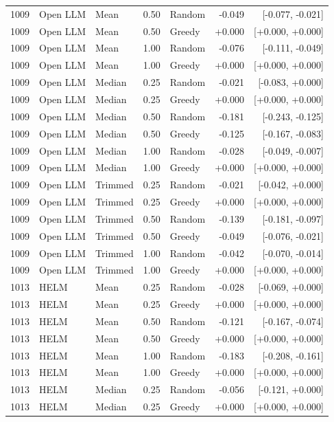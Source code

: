 \documentclass{article}
\begin{document}
\begin{longtable}{rlll lrr}
1009 & Open LLM & Mean & 0.50 & Random & -0.049 & [-0.077, -0.021] \\
1009 & Open LLM & Mean & 0.50 & Greedy & +0.000 & [+0.000, +0.000] \\
1009 & Open LLM & Mean & 1.00 & Random & -0.076 & [-0.111, -0.049] \\
1009 & Open LLM & Mean & 1.00 & Greedy & +0.000 & [+0.000, +0.000] \\
1009 & Open LLM & Median & 0.25 & Random & -0.021 & [-0.083, +0.000] \\
1009 & Open LLM & Median & 0.25 & Greedy & +0.000 & [+0.000, +0.000] \\
1009 & Open LLM & Median & 0.50 & Random & -0.181 & [-0.243, -0.125] \\
1009 & Open LLM & Median & 0.50 & Greedy & -0.125 & [-0.167, -0.083] \\
1009 & Open LLM & Median & 1.00 & Random & -0.028 & [-0.049, -0.007] \\
1009 & Open LLM & Median & 1.00 & Greedy & +0.000 & [+0.000, +0.000] \\
1009 & Open LLM & Trimmed & 0.25 & Random & -0.021 & [-0.042, +0.000] \\
1009 & Open LLM & Trimmed & 0.25 & Greedy & +0.000 & [+0.000, +0.000] \\
1009 & Open LLM & Trimmed & 0.50 & Random & -0.139 & [-0.181, -0.097] \\
1009 & Open LLM & Trimmed & 0.50 & Greedy & -0.049 & [-0.076, -0.021] \\
1009 & Open LLM & Trimmed & 1.00 & Random & -0.042 & [-0.070, -0.014] \\
1009 & Open LLM & Trimmed & 1.00 & Greedy & +0.000 & [+0.000, +0.000] \\
1013 & HELM & Mean & 0.25 & Random & -0.028 & [-0.069, +0.000] \\
1013 & HELM & Mean & 0.25 & Greedy & +0.000 & [+0.000, +0.000] \\
1013 & HELM & Mean & 0.50 & Random & -0.121 & [-0.167, -0.074] \\
1013 & HELM & Mean & 0.50 & Greedy & +0.000 & [+0.000, +0.000] \\
1013 & HELM & Mean & 1.00 & Random & -0.183 & [-0.208, -0.161] \\
1013 & HELM & Mean & 1.00 & Greedy & +0.000 & [+0.000, +0.000] \\
1013 & HELM & Median & 0.25 & Random & -0.056 & [-0.121, +0.000] \\
1013 & HELM & Median & 0.25 & Greedy & +0.000 & [+0.000, +0.000] \\

\end{longtable}
\end{document}
